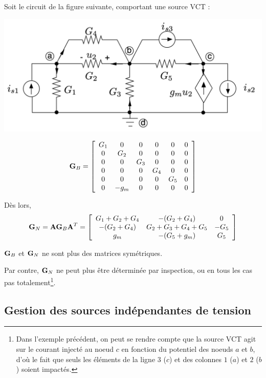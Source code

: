 \begin{testexample}
Soit le circuit de la figure suivante, comportant une source VCT :
\begin{center}
	\includegraphics[width=0.7\linewidth]{figs/methodes-generales/ex_exp_0}
\end{center}
\[{\bf G}_B=
\left[
\begin{array}{cccccc}
G_1 & 0 & 0 & 0 & 0 & 0\\
0 & G_2 & 0 & 0 & 0 & 0 \\
0 & 0 & G_3 & 0 & 0 & 0\\
0 & 0 & 0 & G_4 & 0 & 0\\
0 & 0 & 0 & 0 & G_5 & 0\\
0 & -g_m& 0 & 0 & 0 & 0
\end{array}\right]\]

Dès lors, 
\[{\bf G}_N={\bf A}{\bf G}_B{\bf A}^T= 
\left[
\begin{array}{ccc}
G_1+G_2+G_4 & -(G_2+G_4) & 0 \\
-(G_2+G_4) & G_2+G_3+G_4+G_5 & -G_5 \\
g_m & -(G_5+g_m) & G_5
\end{array}\right]\]

${\bf G}_B$ et  ${\bf G}_N$ ne sont plus des matrices symétriques.
\end{testexample}

Par contre,  ${\bf G}_N$ ne peut plus être déterminée par inspection, ou en tous les cas pas totalement\footnote{Dans l'exemple précédent, on peut se rendre compte que la source VCT agit sur le courant injecté au noeud $c$ en fonction du potentiel des noeuds $a$ et $b$, d'où le fait que seuls les éléments de la ligne $3$ ($c$) et des colonnes $1$ ($a$) et $2$ ($b$) soient impactés.}.

\subsection{Gestion des sources indépendantes de tension}

